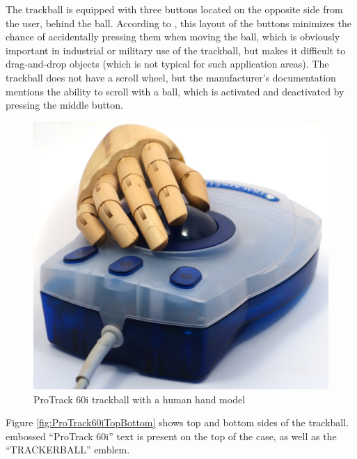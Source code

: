 \documentclass[11pt, a4paper]{article}
\begin{document}
The trackball is equipped with three buttons located on the opposite side from the user, behind the ball.
According to \cite{trackballfan}, this layout of the buttons minimizes the chance of accidentally pressing them when moving the ball, which is obviously important in industrial or military use of the trackball, but makes it difficult to drag-and-drop objects (which is not typical for such application areas).
The trackball does not have a scroll wheel, but the manufacturer's documentation mentions the ability to scroll with a ball, which is activated and deactivated by pressing the middle button.

\begin{figure}[h]
    \centering
    \includegraphics[scale=0.3]{1999_protrack_60i/raz_monstr_60.jpg}
    \caption{ProTrack 60i trackball with a human hand model}
    \label{fig:ProTrack60iHand}
\end{figure}

Figure \ref{fig:ProTrack60iTopBottom} shows top and bottom sides of the trackball.
embossed “ProTrack 60i” text is present on the top of the case, as well as the “TRACKERBALL” emblem.
\end{document}
